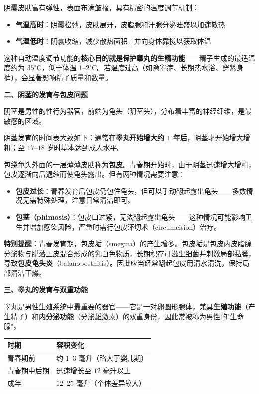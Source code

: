 阴囊皮肤富有弹性，表面布满皱褶，具有精密的温度调节机制：
\begin{itemize}
	\item \textbf{气温高时}：阴囊松弛，皮肤展开，皮脂腺和汗腺分泌旺盛以加速散热
	\item \textbf{气温低时}：阴囊收缩，减少散热面积，并向身体靠拢以获取体温
\end{itemize}

这种自动温度调节功能的\textbf{核心目的就是保护睾丸的生精功能}——精子生成的最适温度约为 $35^\circ\text{C}$，低于体温 $1$--$2^\circ\text{C}$。若温度过高（如隐睾症、长期热水浴、穿紧身裤），会显著影响精子质量和数量。

\vspace{0.3em}
\noindent\textbf{二、阴茎的发育与包皮问题}

阴茎是男性的性行为器官，前端为龟头（阴茎头），分布着丰富的神经纤维，是最敏感的区域。

阴茎发育的时间表大致如下：通常在\textbf{睾丸开始增大约 $1$ 年后}，阴茎才开始增大增粗；至 $17$--$18$ 岁时基本达到成人水平。

包绕龟头外面的一层薄薄皮肤称为\textbf{包皮}。青春期开始时，由于阴茎迅速增大增粗，包皮逐渐向后退缩而使龟头露出。但有两种情况需要注意：
\begin{itemize}
	\item \textbf{包皮过长}：青春发育后包皮仍包住龟头，但可以手动翻起露出龟头——多数情况无需特殊处理，注意日常清洁即可。
	\item \textbf{包茎（phimosis）}：包皮口过紧，无法翻起露出龟头——这种情况可能影响卫生并增加感染风险，严重时需行包皮环切术（circumcision）治疗。
\end{itemize}

\textbf{特别提醒}：青春发育期，包皮垢（smegma）的产生增多。包皮垢是包皮内皮脂腺分泌物与脱落上皮混合形成的乳白色物质，长期积存可滋生细菌并刺激局部黏膜，导致\textbf{包皮龟头炎}（balanoposthitis）。因此应当经常翻起包皮用清水清洗，保持局部清洁干燥。

\vspace{0.3em}
\noindent\textbf{三、睾丸的发育与双重功能}

睾丸是男性生殖系统中最重要的器官——它是一对卵圆形腺体，兼具\textbf{生殖功能}（产生精子）和\textbf{内分泌功能}（分泌雄激素）的双重身份，因此常被称为男性的"生命腺"。

\begin{tabular}{|l|l|}
\hline
\textbf{时期} & \textbf{容积变化} \\
\hline
青春期前 & 约 $1$--$3$ 毫升（略大于婴儿期） \\
\hline
青春期中后期 & 迅速增长至 $12$ 毫升以上 \\
\hline
成年 & $12$--$25$ 毫升（个体差异较大） \\
\hline
\end{tabular}

